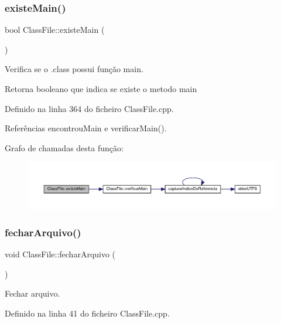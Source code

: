 \subsubsection{\texorpdfstring{existe\+Main()}{existeMain()}}
{\footnotesize\ttfamily bool Class\+File\+::existe\+Main (\begin{DoxyParamCaption}{ }\end{DoxyParamCaption})}



Verifica se o .class possui função main. 

\begin{DoxyReturn}{Retorna}
booleano que indica se existe o metodo main 
\end{DoxyReturn}


Definido na linha 364 do ficheiro Class\+File.\+cpp.



Referências encontrou\+Main e verificar\+Main().

Grafo de chamadas desta função\+:
\nopagebreak
\begin{figure}[H]
\begin{center}
\leavevmode
\includegraphics[width=350pt]{classClassFile_a10bfe22492b473fb0197e55f451978e5_cgraph}
\end{center}
\end{figure}
\mbox{\label{classClassFile_a581c453009afcb8b7a2861a2de8cfb5c}} 
\subsubsection{\texorpdfstring{fechar\+Arquivo()}{fecharArquivo()}}
{\footnotesize\ttfamily void Class\+File\+::fechar\+Arquivo (\begin{DoxyParamCaption}{ }\end{DoxyParamCaption})}



Fechar arquivo. 



Definido na linha 41 do ficheiro Class\+File.\+cpp.



